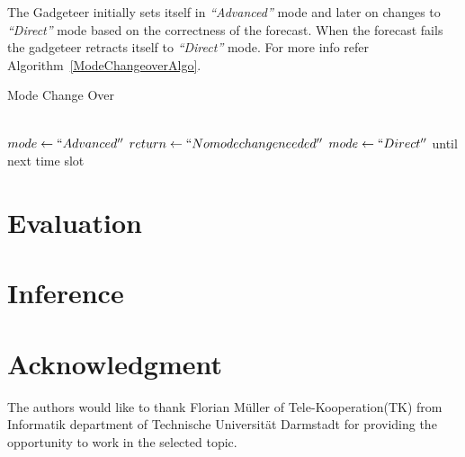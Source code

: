 \documentclass[10pt]{article}
\begin{document}
The Gadgeteer initially sets itself in \emph{``Advanced''} mode and later on changes to \emph{``Direct''} mode based on the correctness of the forecast.
When the forecast fails the gadgeteer retracts itself to \emph{``Direct''} mode. 
For more info refer Algorithm~\ref{ModeChangeoverAlgo}.

\begin{algorithm}
\caption{Mode Change Over}          %
\label{ModeChangeoverAlgo}      
\begin{algorithmic}
\\
\State $mode \gets ``Advanced''$
    \State $return \gets``No mode change needed''$
\Else
    \State $mode \gets ``Direct''$ until next time slot
\EndIf
\end{algorithmic}
\end{algorithm} 


\section*{Evaluation}


\section*{Inference}


\section*{Acknowledgment}

The authors would like to thank Florian Müller of Tele-Kooperation(TK) from Informatik department of Technische Universität Darmstadt for providing the opportunity to work in the selected topic.


\end{document}
